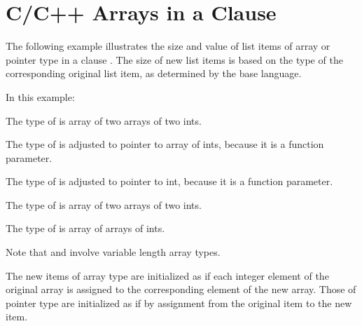\pagebreak
\section{C/C++ Arrays in a  Clause}
\ccppspecificstart
\label{sec:carrays_fpriv}

The following example illustrates the size and value of list items of array or 
pointer type in a  clause . The size of new list items is 
based on the type of the corresponding original list item, as determined by the 
base language.

In this example:

\begin{compactitem}
\item The type of  is array of two arrays of two ints.

\item  The type of  is adjusted to pointer to array of  
ints, because it is a function parameter.

\item  The type of  is adjusted to pointer to int, because 
it is a function parameter.

\item  The type of  is array of two arrays of two ints.

\item  The type of  is array of  arrays of  
ints.
\end{compactitem}

Note that   and  involve variable length array types.

The new items of array type are initialized as if each integer element of the original 
array is assigned to the corresponding element of the new array. Those of pointer 
type are initialized as if by assignment from the original item to the new item.

\ccppspecificend


